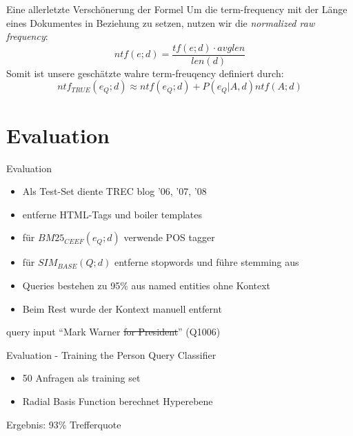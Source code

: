 \documentclass{beamer}
\begin{document}
\begin{frame}{Eine allerletzte Verschönerung der Formel}
Um die term-frequency mit der Länge eines Dokumentes in Beziehung zu setzen, nutzen wir die \textit{normalized raw frequency}:
\[ntf(e;d) = \frac{tf(e;d) \cdot avglen}{len(d)}\]
Somit ist unsere geschätzte wahre term-freuqency definiert durch:
\[\boxed{ntf_{TRUE}(e_Q ; d) \approx ntf(e_Q;d) + P(e_Q|A,d)ntf(A;d)}\]
\end{frame}

\section{Evaluation}



\begin{frame}{Evaluation}
	\begin{itemize}
		\item Als Test-Set diente TREC blog '06, '07, '08
		\item entferne HTML-Tags und boiler templates
		\item für $BM25_{CEEF}(e_Q;d)$ verwende POS tagger
		\item für $SIM_{BASE}(Q;d)$ entferne stopwords und führe stemming aus
		\item Queries bestehen zu 95\% aus named entities ohne Kontext
		\item Beim Rest wurde der Kontext manuell entfernt
	\end{itemize}
	\begin{exampleblock}{query input}
	``Mark Warner \sout{for President}'' (Q1006) \cite{paper:NaNg}
\end{exampleblock}

\end{frame}

\begin{frame}{Evaluation - Training the Person Query Classifier}
	\begin{itemize}
		\item 50 Anfragen als training set
		\item Radial Basis Function berechnet Hyperebene
	\end{itemize}
	Ergebnis: 93\% Trefferquote

\end{frame}
\end{document}
